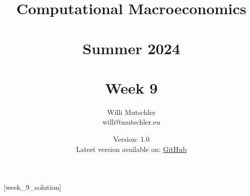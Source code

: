 
\newif\ifDisplaySolutions%


\title{Computational Macroeconomics\\~\\Summer 2024\\~\\Week 9}
\author{Willi Mutschler\\willi@mutschler.eu}
\date{Version: 1.0\\Latest version available on: \href{https://github.com/wmutschl/Computational-Macroeconomics/releases/latest/download/week_9.pdf}{GitHub}}
\maketitle\thispagestyle{empty}

\newpage
{}[week_9_solution]
\tableofcontents\thispagestyle{empty}\newpage

\setcounter{page}{1}
\newpage
\newpage

\printbibliography%

\newpage

\ifDisplaySolutions%
\newpage
\appendix
\section{Solutions}

\fi
